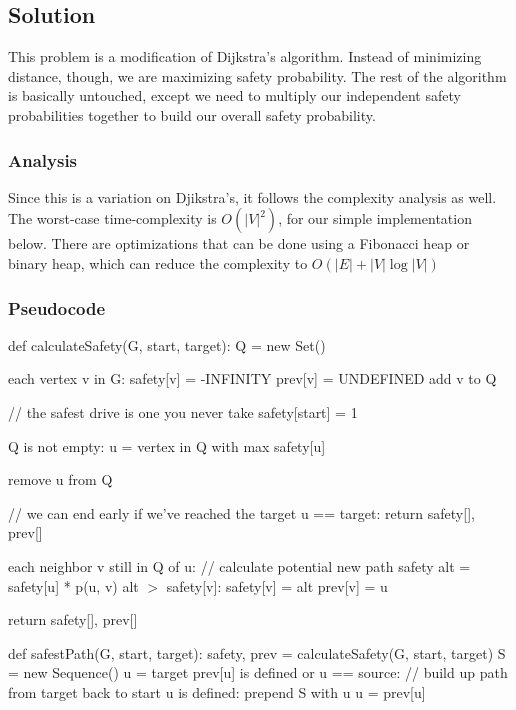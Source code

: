 \subsection*{Solution}

This problem is a modification of Dijkstra's algorithm. Instead of minimizing distance, though, we are maximizing safety probability. The rest of the algorithm is basically untouched, except we need to multiply our independent safety probabilities together to build our overall safety probability.

\subsubsection*{Analysis}

Since this is a variation on Djikstra's, it follows the complexity analysis as well. The worst-case time-complexity is $O(|V|^2)$, for our simple implementation below. There are optimizations that can be done using a Fibonacci heap or binary heap, which can reduce the complexity to $O(|E| + |V| \log |V|)$

\subsubsection*{Pseudocode}
\begin{codebox}
\li def calculateSafety(G, start, target):
\Then
  \li  Q = new Set()

  \li
  \li \For each vertex v in G:
  \Then
    \li  safety[v] = -INFINITY
    \li  prev[v] = UNDEFINED
    \li  add v to Q
  \End

  \li
  \li // the safest drive is one you never take
  \li safety[start] = 1

  \li
  \li \While Q is not empty:
  \Then
    \li u = vertex in Q with max safety[u]

    \li remove u from Q

    \li // we can end early if we've reached the target
    \li \If u == target:
    \Then
      \li return safety[], prev[]
    \End

    \li \For each neighbor v still in Q of u:
    \Then
      \li // calculate potential new path safety
      \li alt = safety[u] * p(u, v)
      \li \If alt $>$ safety[v]:
      \Then
        \li safety[v] = alt
        \li prev[v] = u
      \End
    \End
  \End

  \li return safety[], prev[]
\End
\li

\li def safestPath(G, start, target):
\Then
  \li safety, prev = calculateSafety(G, start, target)
  \li
  \li S = new Sequence()
  \li u = target
  \li \If prev[u] is defined or u == source:
  \Then
    \li // build up path from target back to start
    \li \While u is defined:
    \Then
      \li prepend S with u
      \li u = prev[u]
    \End
  \End

\end{codebox}
